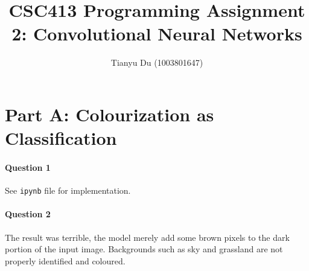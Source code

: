 \documentclass[12pt]{article}
\author{Tianyu Du (1003801647)}
\title{CSC413 Programming Assignment 2: Convolutional Neural Networks}
\begin{document}
	\maketitle
	\section{Part A: Colourization as Classification}
	\paragraph{Question 1} See \texttt{ipynb} file for implementation.
	
	\paragraph{Question 2} The result was terrible, the model merely add some brown pixels to the dark portion of the input image. Backgrounds such as sky and grassland are not properly identified and coloured.
	
\end{document}
